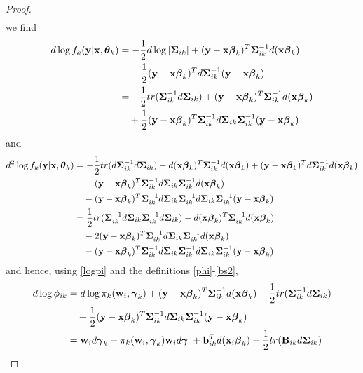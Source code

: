 \begin{proof}
\begin{align*}
\end{align*}
we find 
\begin{align*}
d\log f_{k}(\mathbf y|\mathbf x,\boldsymbol\theta_{k})&=-\frac{1}{2}d\log|\boldsymbol\Sigma_{ik}|+(\mathbf y-\mathbf x\boldsymbol \beta_{k})^{T}\boldsymbol\Sigma_{ik}^{-1}d(\mathbf x\boldsymbol \beta_{k})\\
&\quad-\frac{1}{2}(\mathbf y-\mathbf x\boldsymbol \beta_{k})^{T}d\boldsymbol\Sigma_{ik}^{-1}(\mathbf y-\mathbf x\boldsymbol\beta_{k})\\
&=-\frac{1}{2}tr(\boldsymbol\Sigma_{ik}^{-1}d\boldsymbol\Sigma_{ik})+(\mathbf y-\mathbf x\boldsymbol \beta_{k})^{T}\boldsymbol\Sigma_{ik}^{-1}d(\mathbf x\boldsymbol \beta_{k})\\
&\quad+\frac{1}{2}(\mathbf y-\mathbf x\boldsymbol \beta_{k})^{T}\boldsymbol\Sigma_{ik}^{-1}d\boldsymbol\Sigma_{ik}\boldsymbol\Sigma_{ik}^{-1}(\mathbf y-\mathbf x\boldsymbol\beta_{k})\\
\end{align*}
and
\begin{align*}
d^{2}\log f_{k}(\mathbf y|\mathbf x,\boldsymbol\theta_{k})&=-\frac{1}{2}tr(d\boldsymbol\Sigma_{ik}^{-1}d\boldsymbol\Sigma_{ik})-d(\mathbf x\boldsymbol \beta_{k})^{T}\boldsymbol\Sigma_{ik}^{-1}d(\mathbf x\boldsymbol \beta_{k})+(\mathbf y-\mathbf x\boldsymbol \beta_{k})^{T}d\boldsymbol\Sigma_{ik}^{-1}d(\mathbf x\boldsymbol \beta_{k})\\
&\quad-(\mathbf y-\mathbf x\boldsymbol \beta_{k})^{T}\boldsymbol\Sigma_{ik}^{-1}d\boldsymbol\Sigma_{ik}\boldsymbol\Sigma_{ik}^{-1}d(\mathbf x\boldsymbol\beta_{k})\\
&\quad-(\mathbf y-\mathbf x\boldsymbol \beta_{k})^{T}\boldsymbol\Sigma_{ik}^{-1}d\boldsymbol\Sigma_{ik}\boldsymbol\Sigma_{ik}^{-1}d\boldsymbol\Sigma_{ik}\boldsymbol\Sigma_{ik}^{-1}(\mathbf y-\mathbf x\boldsymbol\beta_{k})\\
&=\frac{1}{2}tr(\boldsymbol\Sigma_{ik}^{-1}d\boldsymbol\Sigma_{ik}\boldsymbol\Sigma_{ik}^{-1}d\boldsymbol\Sigma_{ik})-d(\mathbf x\boldsymbol \beta_{k})^{T}\boldsymbol\Sigma_{ik}^{-1}d(\mathbf x\boldsymbol \beta_{k})\\
&\quad-2(\mathbf y-\mathbf x\boldsymbol \beta_{k})^{T}\boldsymbol\Sigma_{ik}^{-1}d\boldsymbol\Sigma_{ik}\boldsymbol\Sigma_{ik}^{-1}d(\mathbf x\boldsymbol\beta_{k})\\
&\quad-(\mathbf y-\mathbf x\boldsymbol \beta_{k})^{T}\boldsymbol\Sigma_{ik}^{-1}d\boldsymbol\Sigma_{ik}\boldsymbol\Sigma_{ik}^{-1}d\boldsymbol\Sigma_{ik}\boldsymbol\Sigma_{ik}^{-1}(\mathbf y-\mathbf x\boldsymbol\beta_{k})\\
\end{align*}
and hence, using \eqref{logpi} and the definitions \eqref{phi}-\eqref{bs2},
\begin{align*}
d\log \phi_{ik}&=d\log \pi_{k}(\B w_{i},\BS\gamma_k)+(\B y-\B x\BS \beta_{k})^{T}\BS\Sigma_{ik}^{-1}d(\B x\BS \beta_{k})-\frac{1}{2}tr(\BS\Sigma_{ik}^{-1}d\BS\Sigma_{ik})\\
&\quad+\frac{1}{2}(\B y-\B x\BS \beta_{k})^{T}\BS\Sigma_{ik}^{-1}d\BS\Sigma_{ik}\BS\Sigma_{ik}^{-1}(\B y-\B x\BS\beta_{k})\\
&=\B w_{i} d\BS \gamma_{k} -\pi_{k}(\B w_{i},\BS\gamma_k)\B w_{i}d\BS\gamma_{\cdot}+\B b^{T}_{ik}d(\B x_{i}\BS \beta_{k})-\frac{1}{2}tr(\B B_{ik}d\BS\Sigma_{ik})

\end{align*}
\end{proof}
